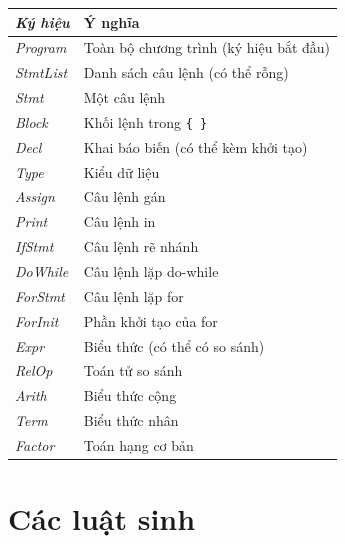 \documentclass[11pt,a4paper]{article}
\begin{document}
\begin{table}[h]
\centering
\begin{tabularx}{\linewidth}{@{}>{\itshape}l X@{}}
\toprule
\textbf{Ký hiệu} & \textbf{Ý nghĩa} \\
\midrule
Program  & Toàn bộ chương trình (ký hiệu bắt đầu) \\
StmtList & Danh sách câu lệnh (có thể rỗng) \\
Stmt     & Một câu lệnh \\
Block    & Khối lệnh trong \texttt{\{ \}} \\
Decl     & Khai báo biến (có thể kèm khởi tạo) \\
Type     & Kiểu dữ liệu \\
Assign   & Câu lệnh gán \\
Print    & Câu lệnh in \\
IfStmt   & Câu lệnh rẽ nhánh \\
DoWhile  & Câu lệnh lặp do-while \\
ForStmt  & Câu lệnh lặp for \\
ForInit  & Phần khởi tạo của for \\
Expr     & Biểu thức (có thể có so sánh) \\
RelOp    & Toán tử so sánh \\
Arith    & Biểu thức cộng \\
Term     & Biểu thức nhân \\
Factor   & Toán hạng cơ bản \\
\bottomrule
\end{tabularx}
\end{table}

\clearpage %
\section{Các luật sinh}
\end{document}

